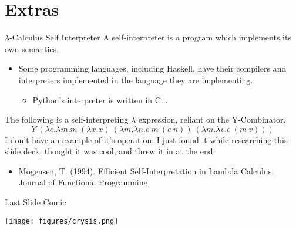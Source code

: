 \documentclass[11pt]{beamer}
\begin{document}
\section[Extra]{Extras}
\begin{frame}[fragile=singleslide]{$\lambda$-Calculus Self Interpreter}
A self-interpreter is a program which implements its own semantics.  
\begin{itemize}
\item Some programming languages, including Haskell, have their compilers and interpreters implemented in the language they are implementing.
\begin{itemize}
\item Python's interpreter is written in C...
\end{itemize}
\end{itemize}
The following is a self-interpreting $\lambda$ expression, reliant on the Y-Combinator.
\begin{equation}
Y\:(\lambda e.\lambda m. m\:(\lambda x. x)\:(\lambda m.\lambda n. e\:m\:(e\:n))\:(\lambda m. \lambda v. e\:(m\:v)))
\end{equation}
I don't have an example of it's operation, I just found it while researching this slide deck, thought it was cool, and threw it in at the end. 
\begin{itemize}
\item Mogensen, T. (1994). Efficient Self-Interpretation in Lambda Calculus. Journal of Functional Programming.
\end{itemize}
\end{frame}



\begin{frame}[fragile=singleslide]{Last Slide Comic}
\begin{center}
\texttt{[image: figures/crysis.png]}
\end{center}
\end{frame}
\end{document}
